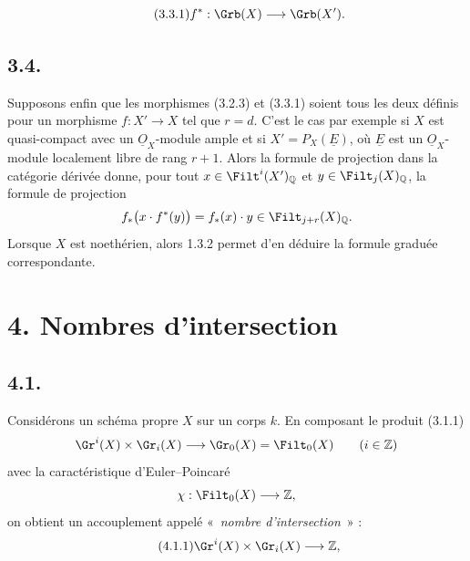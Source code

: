 
\begin{equation}\tag{3.3.1}
 f^*:\Grb(X)\longrightarrow\Grb(X').
\end{equation}

\subsection*{3.4.}
Supposons enfin que les morphismes (3.2.3) et (3.3.1) soient tous les deux définis pour un morphisme \(f:X'\to X\) tel que \(r=d\). C'est le cas par exemple si \(X\) est quasi-compact avec un \(\underline{O}_X\)-module ample et si \(X'=P_X(\underline{E})\), où \(\underline{E}\) est un \(\underline{O}_X\)-module localement libre de rang \(r+1\). Alors la formule de projection dans la catégorie dérivée donne, pour tout \(x\in\Filt^i(X')_{\mathbb Q}\) et \(y\in\Filt_j(X)_{\mathbb Q}\), la formule de projection
\[
 f_*\bigl(x\cdot f^*(y)\bigr)=f_*(x)\cdot y\in\Filt_{j+r}(X)_{\mathbb Q}.
\]
Lorsque \(X\) est noethérien, alors 1.3.2 permet d'en déduire la formule graduée correspondante.

\section*{4. Nombres d'intersection}

\subsection*{4.1.}
Considérons un schéma propre \(X\) sur un corps \(k\). En composant le produit (3.1.1)
\[
 \Gr^i(X)\times\Gr_i(X)\longrightarrow \Gr_0(X)=\Filt_0(X)
 \qquad (i\in\mathbb Z)
\]
avec la caractéristique d'Euler--Poincaré
\[
 \chi:\Filt_0(X)\longrightarrow\mathbb Z,
\]
on obtient un accouplement appelé «~\emph{nombre d'intersection}~» :
\begin{equation}\tag{4.1.1}
 \Gr^i(X)\times\Gr_i(X)\longrightarrow \mathbb Z,
\end{equation}
